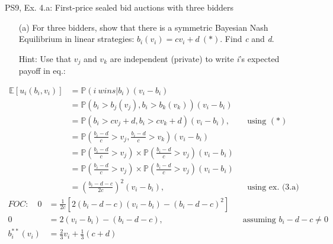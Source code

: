 \begin{frame}{PS9, Ex. 4.a: First-price sealed bid auctions with three bidders}
    \begin{itemize}
      \item[(a)] For three bidders, show that there is a symmetric Bayesian Nash Equilibrium in linear strategies: $b_i(v_i) = cv_i + d\ (*)$. Find \textit{c} and \textit{d}.
      \item[Hint:] Use that $v_j$ and $v_k$ are independent (private) to write \textit{i}'s expected payoff in eq.:
    \end{itemize}
    \vspace{-10pt}
    \begin{align*}
      \mathbb{E}[u_i(b_i,v_i)]
      &=\mathbb{P}(i\ wins|b_i)(v_i-b_i)\\
      &=\mathbb{P}\left(b_i>b_j(v_j),b_i>b_k(v_k)\right)(v_i-b_i)\\
      &=\mathbb{P}(b_i>cv_j+d,b_i>cv_k+d)(v_i-b_i),&&\text{using }(*)\\
      &=\mathbb{P}\left(\frac{b_i-d}{c}>v_j,\frac{b_i-d}{c}>v_k\right)(v_i-b_i)\\
      &=\mathbb{P}\left(\frac{b_i-d}{c}>v_j\right)\times\mathbb{P}\left(\frac{b_i-d}{c}>v_j\right)(v_i-b_i)\\
      &=\mathbb{P}\left(\frac{b_i-d}{c}>v_j\right)\times\mathbb{P}\left(\frac{b_i-d}{c}>v_j\right)(v_i-b_i)\\
      &=\left(\frac{b_i-d-c}{2c}\right)^2(v_i-b_i),&&\text{using ex. (3.a)}
    \end{align*}
    \vspace{-8pt}
    \begin{align*}
      FOC:\quad   0&=\frac{1}{2c}[2(b_i-d-c)(v_i-b_i)-(b_i-d-c)^2]\\
                  0&=2(v_i-b_i)-(b_i-d-c),&&\text{assuming }b_i-d-c\neq0\\
      b_i^{**}(v_i)&=\frac{2}{3}v_i+\frac{1}{3}(c+d)
    \end{align*}
    \vfill\null
\end{frame}

